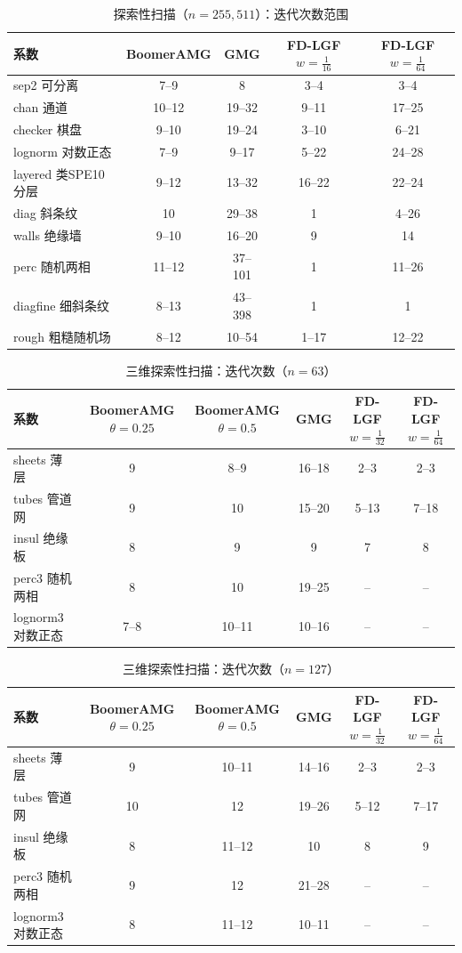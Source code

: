\begin{table}[H]\centering\small
\caption{探索性扫描（$n=255, 511$）：迭代次数范围}\label{tab:scan}
\begin{tabular}{lcccc}
\toprule
系数 & BoomerAMG & GMG & FD-LGF $w{=}\frac1{16}$ & FD-LGF $w{=}\frac1{64}$ \\
\midrule
sep2 可分离 & 7--9 & 8 & 3--4 & 3--4 \\
chan 通道 & 10--12 & 19--32 & 9--11 & 17--25 \\
checker 棋盘 & 9--10 & 19--24 & 3--10 & 6--21 \\
lognorm 对数正态 & 7--9 & 9--17 & 5--22 & 24--28 \\
layered 类SPE10分层 & 9--12 & 13--32 & 16--22 & 22--24 \\
diag 斜条纹 & 10 & 29--38 & 1 & 4--26 \\
walls 绝缘墙 & 9--10 & 16--20 & 9 & 14 \\
perc 随机两相 & 11--12 & 37--101 & 1 & 11--26 \\
diagfine 细斜条纹 & 8--13 & 43--398 & 1 & 1 \\
rough 粗糙随机场 & 8--12 & 10--54 & 1--17 & 12--22 \\
\bottomrule
\end{tabular}
\end{table}

\begin{table}[H]\centering\small
\caption{三维探索性扫描：迭代次数（$n=63$）}\label{tab:s3its63}
\begin{tabular}{lccccc}
\toprule
系数 & BoomerAMG $\theta{=}0.25$ & BoomerAMG $\theta{=}0.5$ & GMG & FD-LGF $w{=}\frac1{32}$ & FD-LGF $w{=}\frac1{64}$ \\
\midrule
sheets 薄层 & 9 & 8--9 & 16--18 & 2--3 & 2--3 \\
tubes 管道网 & 9 & 10 & 15--20 & 5--13 & 7--18 \\
insul 绝缘板 & 8 & 9 & 9 & 7 & 8 \\
perc3 随机两相 & 8 & 10 & 19--25 & -- & -- \\
lognorm3 对数正态 & 7--8 & 10--11 & 10--16 & -- & -- \\
\bottomrule
\end{tabular}
\end{table}

\begin{table}[H]\centering\small
\caption{三维探索性扫描：迭代次数（$n=127$）}\label{tab:s3its127}
\begin{tabular}{lccccc}
\toprule
系数 & BoomerAMG $\theta{=}0.25$ & BoomerAMG $\theta{=}0.5$ & GMG & FD-LGF $w{=}\frac1{32}$ & FD-LGF $w{=}\frac1{64}$ \\
\midrule
sheets 薄层 & 9 & 10--11 & 14--16 & 2--3 & 2--3 \\
tubes 管道网 & 10 & 12 & 19--26 & 5--12 & 7--17 \\
insul 绝缘板 & 8 & 11--12 & 10 & 8 & 9 \\
perc3 随机两相 & 9 & 12 & 21--28 & -- & -- \\
lognorm3 对数正态 & 8 & 11--12 & 10--11 & -- & -- \\
\bottomrule
\end{tabular}
\end{table}

